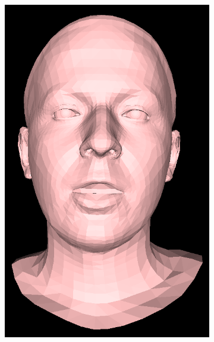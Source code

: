 \documentclass[12pt]{report}
\begin{document}
\begin{figure}[h]
\begin{subfigure}[b]{0.19\textwidth}
        \includegraphics[width=\textwidth]{figures/voca_exp/vocaset_exp2.png}
    \end{subfigure}
    \begin{subfigure}[b]{0.19\textwidth}

\end{subfigure}
\end{figure}
\end{document}
